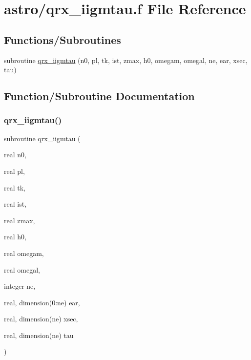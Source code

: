 \hypertarget{qrx__iigmtau_8f}{}\section{astro/qrx\+\_\+iigmtau.f File Reference}
\label{qrx__iigmtau_8f}
\subsection*{Functions/\+Subroutines}
\begin{DoxyCompactItemize}
\item 
subroutine \hyperlink{qrx__iigmtau_8f_a473e6e5ced268ceca63732a6c3843bc6}{qrx\+\_\+iigmtau} (n0, pl, tk, ist, zmax, h0, omegam, omegal, ne, ear, xsec, tau)
\end{DoxyCompactItemize}


\subsection{Function/\+Subroutine Documentation}
\mbox{\label{qrx__iigmtau_8f_a473e6e5ced268ceca63732a6c3843bc6}} 
\subsubsection{\texorpdfstring{qrx\+\_\+iigmtau()}{qrx\_iigmtau()}}
{\footnotesize\ttfamily subroutine qrx\+\_\+iigmtau (\begin{DoxyParamCaption}\item[{real}]{n0,  }\item[{real}]{pl,  }\item[{real}]{tk,  }\item[{real}]{ist,  }\item[{real}]{zmax,  }\item[{real}]{h0,  }\item[{real}]{omegam,  }\item[{real}]{omegal,  }\item[{integer}]{ne,  }\item[{real, dimension(0\+:ne)}]{ear,  }\item[{real, dimension(ne)}]{xsec,  }\item[{real, dimension(ne)}]{tau }\end{DoxyParamCaption})}

